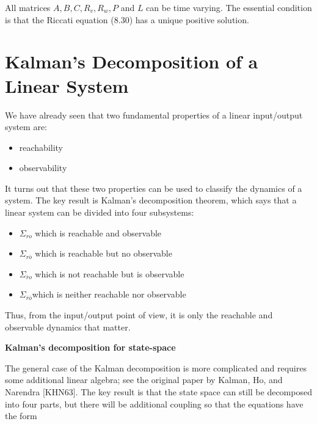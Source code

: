 All matrices $A, B, C, R_v, R_w, P$ and $L$ can be time varying. The essential condition is that the Riccati equation (8.30) has a unique positive 
solution.

\section{Kalman’s Decomposition of a Linear System}

We have already seen that two fundamental properties
of a linear input/output system are:

\begin{itemize}
\item reachability 
\item observability
\end{itemize}

It turns out that these two properties can be used to classify the dynamics of a system. The key
result is Kalman’s decomposition theorem, which says that a linear system can be
divided into four subsystems:

\begin{itemize}
\item $\Sigma_{ro}$ which is reachable and observable
\item $\Sigma_{r\bar{o}}$ which is reachable but no observable 
\item $\Sigma_{\bar{r}o}$ which is not reachable but is observable
\item $\Sigma_{\bar{r}\bar{o}}$which is neither reachable nor observable
\end{itemize}


Thus, from the input/output point of view, it is only the reachable and observable
dynamics that matter.

\begin{framed}
\theoremstyle{remark}
\begin{remark}{\textbf{Kalman's decomposition for state-space}}

The general case of the Kalman decomposition is more complicated and requires some additional linear algebra; 
see the original paper by Kalman, Ho, and Narendra [KHN63]. The key result is that the state space can still be decomposed
into four parts, but there will be additional coupling so that the equations have the form 
\end{remark}
\end{framed}


